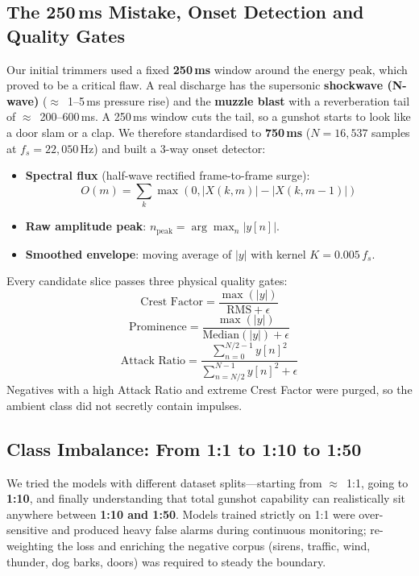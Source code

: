 \documentclass[conference]{IEEEtran}
\begin{document}
\subsection{The 250\,ms Mistake, Onset Detection and Quality Gates}
Our initial trimmers used a fixed \textbf{250\,ms} window around the energy peak, which proved to be a
critical flaw. A real discharge has the supersonic \textbf{shockwave (N-wave)} ($\approx$~1--5\,ms pressure
rise) and the \textbf{muzzle blast} with a reverberation tail of $\approx$~200--600\,ms. A 250\,ms window cuts
the tail, so a gunshot starts to look like a door slam or a clap. We therefore standardised to
\textbf{750\,ms} ($N=16{,}537$ samples at $f_s=22{,}050$\,Hz) and built a 3-way onset detector:
\begin{itemize}
    \item \textbf{Spectral flux} (half-wave rectified frame-to-frame surge):
    \begin{equation}
        O(m) = \sum_{k} \max\left(0, |X(k,m)| - |X(k,m-1)|\right)
    \end{equation}
    \item \textbf{Raw amplitude peak}: $n_{\text{peak}} = \arg\max_n |y[n]|$.
    \item \textbf{Smoothed envelope}: moving average of $|y|$ with kernel $K = 0.005\,f_s$.
\end{itemize}
Every candidate slice passes three physical quality gates:
\begin{equation}
    \text{Crest Factor} = \frac{\max(|y|)}{\text{RMS} + \epsilon}
\end{equation}
\begin{equation}
    \text{Prominence} = \frac{\max(|y|)}{\text{Median}(|y|) + \epsilon}
\end{equation}
\begin{equation}
    \text{Attack Ratio} = \frac{\sum_{n=0}^{N/2-1} y[n]^2}{\sum_{n=N/2}^{N-1} y[n]^2 + \epsilon}
\end{equation}
Negatives with a high Attack Ratio and extreme Crest Factor were purged, so the ambient class did not
secretly contain impulses.

\subsection{Class Imbalance: From 1:1 to 1:10 to 1:50}
We tried the models with different dataset splits---starting from $\approx$~1:1, going to \textbf{1:10}, and
finally understanding that total gunshot capability can realistically sit anywhere between \textbf{1:10 and
1:50}. Models trained strictly on 1:1 were over-sensitive and produced heavy false alarms during continuous
monitoring; re-weighting the loss and enriching the negative corpus (sirens, traffic, wind, thunder, dog
barks, doors) was required to steady the boundary.
\end{document}
